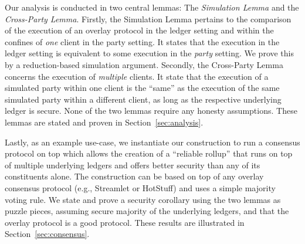 Our analysis is conducted in two central lemmas: The \emph{Simulation Lemma}
and the \emph{Cross-Party Lemma}.
Firstly, the Simulation Lemma pertains to the comparison of the execution
of an overlay protocol in the ledger setting and within the confines of
\emph{one} \rollerblade client in the party setting.
It states that the execution in the ledger setting
is equivalent to some execution in the \emph{party} setting.
We prove this by a reduction-based simulation argument.
Secondly, the Cross-Party Lemma concerns the execution of \emph{multiple}
\rollerblade clients. It state that the execution of a simulated party
within one \rollerblade client is the ``same'' as the execution of the
same simulated party within a different \rollerblade client, as long
as the respective underlying ledger is secure.
None of the two lemmas require any honesty assumptions.
These lemmas are stated and proven in Section~\ref{sec:analysis}.

Lastly, as an example use-case, we instantiate our \rollerblade construction
to run a consensus protocol on top which allows the creation of a ``reliable
rollup'' that runs on top of multiple underlying ledgers and offers better security
than any of its constituents alone. The construction can be based on top of any
overlay consensus protocol (e.g., Streamlet or HotStuff) and uses a simple
majority voting rule.  We state and prove a security corollary
using the two lemmas as puzzle pieces, assuming secure majority of the underlying
ledgers, and that the overlay protocol is a good protocol. These results
are illustrated in Section~\ref{sec:consensus}.


